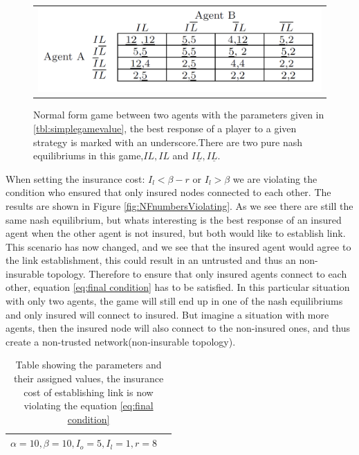 \begin{figure}[h]
\centering
\begin{tabular}{@{}c@{}}
\includegraphics[width=1.0\textwidth]{../Figures/gameTheoryModel1WithNumbers.png}
\end{tabular}
\caption[Caption for LOF]{Normal form game between two agents with the parameters given in \ref{tbl:simplegamevalue}, the best response of a player to a given strategy is marked with an underscore.There are two pure nash equilibriums in this game,$IL,IL$ and $I\underline{L},I\underline{L}$. \label{fig:NFnumbers}}
\end{figure}
When setting the insurance cost: $I_{l}<\beta - r$ or $I_{l}>\beta$ we are violating the condition who ensured that only insured nodes connected to each other. The results are shown in Figure \ref{fig:NFnumbersViolating}. As we see there are still the same nash equilibrium, but whats interesting is the best response of an insured agent when the other agent is not insured, but both would like to establish link. This scenario has now changed, and we see that the insured agent would agree to the link establishment, this could result in an untrusted and thus an non-insurable topology. Therefore to ensure that only insured agents connect to each other, equation \ref{eq:final condition} has to be satisfied. 
In this particular situation with only two agents, the game will still end up in one of the nash equilibriums and only insured will connect to insured. But imagine a situation with more agents, then the insured node will also connect to the non-insured ones, and thus create a non-trusted network(non-insurable topology).
\begin{table}[h]
\centering
\begin{tabular}{lc}
 \hline
  $\alpha=10,
  \beta=10,
  I_{o}=5,
  I_{l}=1,
  r=8$\\
  \hline
\end{tabular}
\caption{Table showing the parameters and their assigned values, the insurance cost of establishing link is now violating the equation \ref{eq:final condition} \label{tbl:simplegamevalue2}}
\end{table}


